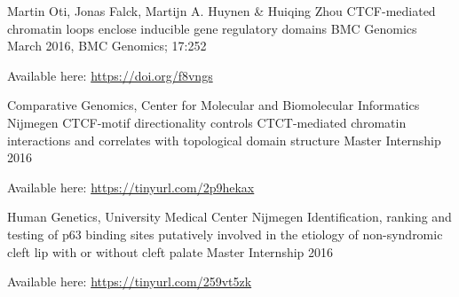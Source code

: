 

\begin{cventries}

\cventry
  {Martin Oti, Jonas Falck, Martijn A. Huynen \& Huiqing Zhou}
  {CTCF-mediated chromatin loops enclose inducible gene regulatory domains} %
  {BMC Genomics}
  {March 2016, BMC Genomics; 17:252} %
  {    
  \begin{cvitems} %
    \item {Available here: \href{https://doi.org/f8vngs}{https://doi.org/f8vngs}}
  \end{cvitems}
  }

\cventry
  {Comparative Genomics,  Center for Molecular and Biomolecular Informatics Nijmegen} %
  {CTCF-motif directionality controls CTCT-mediated chromatin interactions and correlates with topological domain structure} %
  {Master Internship} %
  {2016} %
  {
    \begin{cvitems} %
      \item {Available here: \href{https://tinyurl.com/2p9hekax}{https://tinyurl.com/2p9hekax}}
    \end{cvitems}
  }

\cventry
  {Human Genetics, University Medical Center Nijmegen} %
  {Identification, ranking and testing of p63 binding sites putatively involved in the etiology of non-syndromic cleft lip with or without cleft palate} %
  {Master Internship} %
  {2016} %
  {
    \begin{cvitems} %
      \item {Available here: \href{https://tinyurl.com/259vt5zk}{https://tinyurl.com/259vt5zk}}
    \end{cvitems}
  }

\end{cventries}

